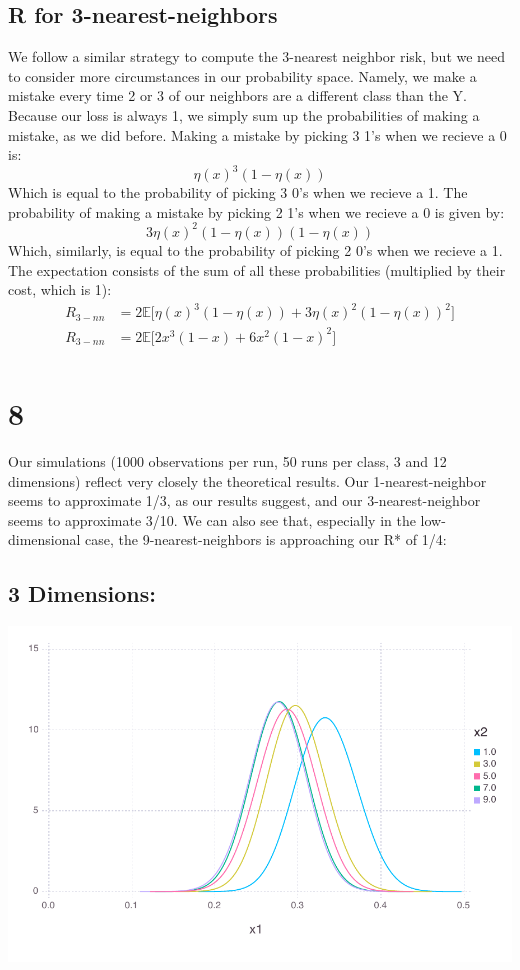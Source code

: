 \documentclass[a4paper,12pt]{article}
\begin{document}
\subsection*{R for 3-nearest-neighbors}
We follow a similar strategy to compute the 3-nearest neighbor risk, but we need to consider more circumstances in our probability space. Namely, we make a mistake every time 2 or 3 of our neighbors are a different class than the Y. Because our loss is always 1, we simply sum up the probabilities of making a mistake, as we did before. Making a mistake by picking 3 1's when we recieve a 0 is:
%
$$
\eta(x)^3(1 - \eta(x))
$$
%
Which is equal to the probability of picking 3 0's when we recieve a 1. The probability of making a mistake by picking 2 1's when we recieve a 0 is given by:
%
$$
3\eta(x)^2(1-\eta(x))(1-\eta(x))
$$
%
Which, similarly, is equal to the probability of picking 2 0's when we recieve a 1. The expectation consists of the sum of all these probabilities (multiplied by their cost, which is 1):
\begin{align*}
R_{3-nn} &= 2\mathbb{E} \big[ \eta(x)^3(1 - \eta(x)) + 3\eta(x)^2(1-\eta(x))^2 \big] \\
R_{3-nn} &= 2\mathbb{E} \big[ 2x^3(1 - x) + 6x^2(1 - x)^2 \big] \\
\end{align*}
\section*{8}
Our simulations (1000 observations per run, 50 runs per class, 3 and 12 dimensions) reflect very closely the theoretical results. Our 1-nearest-neighbor seems to approximate 1/3, as our results suggest, and our 3-nearest-neighbor seems to approximate 3/10. We can also see that, especially in the low-dimensional case, the 9-nearest-neighbors is approaching our R* of 1/4:




\subsection*{3 Dimensions:}
\includegraphics[width=\linewidth]{figures/two_3_1.pdf}
\end{document}
